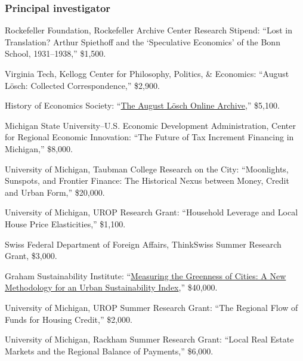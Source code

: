 \documentclass[letter,11pt]{article}
\newlength{\cvlabelw}
\newenvironment{cvlist}[1][2.5cm]{%
  \setlength{\cvlabelw}{#1}%
  \begin{list}{}{%
    \setlength{\leftmargin}{\cvlabelw}\setlength{\labelwidth}{\cvlabelw}%
    \setlength{\labelsep}{0pt}\setlength{\itemindent}{0pt}\setlength{\listparindent}{0pt}%
    \setlength{\itemsep}{4pt}\setlength{\parsep}{0pt}\setlength{\topsep}{3pt}\setlength{\partopsep}{0pt}%
    \renewcommand{\makelabel}[1]{##1\hfil}}}{\end{list}}
\begin{document}
\subsubsection*{Principal investigator}
\begin{cvlist}
\item[2023] Rockefeller Foundation, Rockefeller Archive Center Research Stipend: \enquote{Lost in Translation? Arthur Spiethoff and the `Speculative Economics' of the Bonn School, 1931--1938,} \$1,500.
\item[2020] Virginia Tech, Kellogg Center for Philosophy, Politics, \& Economics: \enquote{August L\"{o}sch: Collected Correspondence,} \$2,900.
\item[2018] History of Economics Society: \enquote{\href{http://www.august-loesch.org/}{The August L\"{o}sch Online Archive},} \$5,100.
\item[2014] Michigan State University--U.S. Economic Development Administration, Center for Regional Economic Innovation: \enquote{The Future of Tax Increment Financing in Michigan,} \$8,000.
\item[2013] University of Michigan, Taubman College Research on the City: \enquote{Moonlights, Sunspots, and Frontier Finance: The Historical Nexus between Money, Credit and Urban Form,} \$20,000.
\item[] University of Michigan, UROP Research Grant: \enquote{Household Leverage and Local House Price Elasticities,} \$1,100.
\item[] Swiss Federal Department of Foreign Affairs, ThinkSwiss Summer Research Grant, \$3,000.
\item[2011 -- 2013] Graham Sustainability Institute: \enquote{\href{http://sustainability.umich.edu/news/u-m-faculty-selected-detroit-sustainability-indicators-project}{Measuring the Greenness of Cities: A New Methodology for an Urban Sustainability Index},} \$40,000.
\item[2012] University of Michigan, UROP Summer Research Grant: \enquote{The Regional Flow of Funds for Housing Credit,} \$2,000.
\item[2011] University of Michigan, Rackham Summer Research Grant: \enquote{Local Real Estate Markets and the Regional Balance of Payments,} \$6,000.
\end{cvlist}
\end{document}
